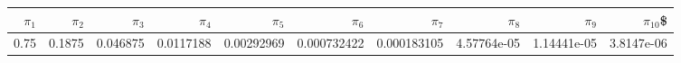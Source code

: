 \begin{figure}[H]
	\centering
	\begin{tabular}{rrrrrrrrrr}
		\toprule
		$\pi_1$ &   $\pi_2$ &    $\pi_3$ &     $\pi_4$ &      $\pi_5$ &       $\pi_6$ &       $\pi_7$ &       $\pi_8$ &       $\pi_9$ &    $\pi_10$\$ \\
		\midrule
		0.75 &  0.1875 & 0.046875 & 0.0117188 & 0.00292969 & 0.000732422 & 0.000183105 & 4.57764e-05 & 1.14441e-05 & 3.8147e-06 \\
		\bottomrule
	\end{tabular}
\end{figure}
